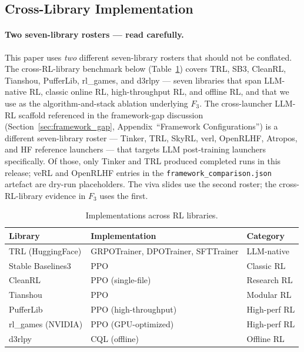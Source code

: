 \documentclass{article}
\begin{document}
\subsection{Cross-Library Implementation}

\paragraph{Two seven-library rosters --- read carefully.}
This paper uses \emph{two} different seven-library rosters that
should not be conflated. The cross-RL-library benchmark below
(Table~\ref{tab:implementations}) covers TRL, SB3, CleanRL, Tianshou,
PufferLib, rl\_games, and d3rlpy --- seven libraries that span
LLM-native RL, classic online RL, high-throughput RL, and offline RL,
and that we use as the algorithm-and-stack ablation underlying $F_3$.
The cross-launcher LLM-RL scaffold referenced in the framework-gap
discussion (Section~\ref{sec:framework_gap},
Appendix~``Framework Configurations'') is a different seven-library
roster --- Tinker, TRL, SkyRL, verl, OpenRLHF, Atropos, and HF
reference launchers --- that targets LLM post-training launchers
specifically. Of those, only Tinker and TRL produced completed
runs in this release; veRL and OpenRLHF entries in the
\texttt{framework\_comparison.json} artefact are dry-run
placeholders. The viva slides use the second roster; the
cross-RL-library evidence in $F_3$ uses the first.


\begin{table}[htbp]
\centering
\caption{Implementations across RL libraries.}
\label{tab:implementations}
\begin{tabular}{lll}
\toprule
\textbf{Library} & \textbf{Implementation} & \textbf{Category} \\
\midrule
TRL (HuggingFace) & GRPOTrainer, DPOTrainer, SFTTrainer & LLM-native \\
Stable Baselines3 & PPO & Classic RL \\
CleanRL & PPO (single-file) & Research RL \\
Tianshou & PPO & Modular RL \\
PufferLib & PPO (high-throughput) & High-perf RL \\
rl\_games (NVIDIA) & PPO (GPU-optimized) & High-perf RL \\
d3rlpy & CQL (offline) & Offline RL \\
\bottomrule
\end{tabular}
\end{table}
\end{document}
